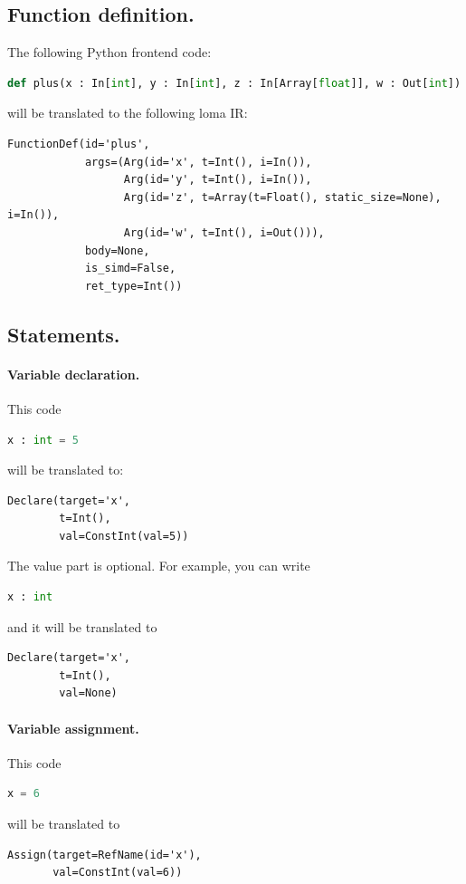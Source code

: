 \subsection{Function definition.} 
The following Python frontend code:
\begin{lstlisting}[language=Python]
def plus(x : In[int], y : In[int], z : In[Array[float]], w : Out[int]) -> int:
\end{lstlisting}
will be translated to the following loma IR:
\begin{lstlisting}
FunctionDef(id='plus',
            args=(Arg(id='x', t=Int(), i=In()),
                  Arg(id='y', t=Int(), i=In()),
                  Arg(id='z', t=Array(t=Float(), static_size=None), i=In()),
                  Arg(id='w', t=Int(), i=Out())),
            body=None,
            is_simd=False,
            ret_type=Int())
\end{lstlisting}

\subsection{Statements.} 

\paragraph{Variable declaration.} This code
\begin{lstlisting}[language=Python]
x : int = 5
\end{lstlisting}
will be translated to:
\begin{lstlisting}
Declare(target='x',
        t=Int(),
        val=ConstInt(val=5))
\end{lstlisting}

The value part is optional. For example, you can write
\begin{lstlisting}[language=Python]
x : int
\end{lstlisting}
and it will be translated to
\begin{lstlisting}
Declare(target='x',
        t=Int(),
        val=None)
\end{lstlisting}

\paragraph{Variable assignment.} This code
\begin{lstlisting}[language=Python]
x = 6
\end{lstlisting}
will be translated to
\begin{lstlisting}
Assign(target=RefName(id='x'),
       val=ConstInt(val=6))
\end{lstlisting}

